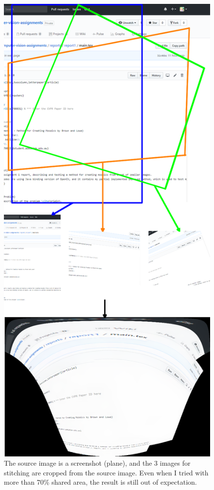 \documentclass[10pt,twocolumn,letterpaper]{article}
\begin{document}
\begin{figure}[h]
	\centering
    \includegraphics[width=\textwidth]{fail}
	\caption[Failed test]
	{The source image is a screenshot (plane), and the 3 images for stitching are cropped from the source image. Even when I tried with more than 70\% shared area, the result is still out of expectation.}
    \label{fig:f}
\end{figure}
\end{document}
